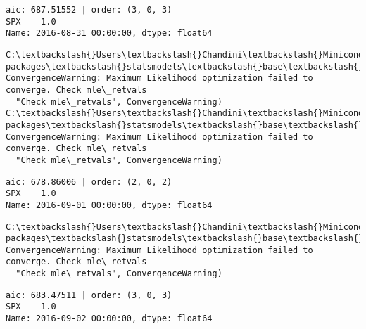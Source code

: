 \documentclass[11pt]{article}
\begin{document}
    \begin{Verbatim}[commandchars=\\\{\}]
aic: 687.51552 | order: (3, 0, 3)
SPX    1.0
Name: 2016-08-31 00:00:00, dtype: float64

    \end{Verbatim}

    \begin{Verbatim}[commandchars=\\\{\}]
C:\textbackslash{}Users\textbackslash{}Chandini\textbackslash{}Miniconda3\textbackslash{}envs\textbackslash{}auquan\textbackslash{}lib\textbackslash{}site-packages\textbackslash{}statsmodels\textbackslash{}base\textbackslash{}model.py:496: ConvergenceWarning: Maximum Likelihood optimization failed to converge. Check mle\_retvals
  "Check mle\_retvals", ConvergenceWarning)
C:\textbackslash{}Users\textbackslash{}Chandini\textbackslash{}Miniconda3\textbackslash{}envs\textbackslash{}auquan\textbackslash{}lib\textbackslash{}site-packages\textbackslash{}statsmodels\textbackslash{}base\textbackslash{}model.py:496: ConvergenceWarning: Maximum Likelihood optimization failed to converge. Check mle\_retvals
  "Check mle\_retvals", ConvergenceWarning)

    \end{Verbatim}

    \begin{Verbatim}[commandchars=\\\{\}]
aic: 678.86006 | order: (2, 0, 2)
SPX    1.0
Name: 2016-09-01 00:00:00, dtype: float64

    \end{Verbatim}

    \begin{Verbatim}[commandchars=\\\{\}]
C:\textbackslash{}Users\textbackslash{}Chandini\textbackslash{}Miniconda3\textbackslash{}envs\textbackslash{}auquan\textbackslash{}lib\textbackslash{}site-packages\textbackslash{}statsmodels\textbackslash{}base\textbackslash{}model.py:496: ConvergenceWarning: Maximum Likelihood optimization failed to converge. Check mle\_retvals
  "Check mle\_retvals", ConvergenceWarning)

    \end{Verbatim}

    \begin{Verbatim}[commandchars=\\\{\}]
aic: 683.47511 | order: (3, 0, 3)
SPX    1.0
Name: 2016-09-02 00:00:00, dtype: float64

    \end{Verbatim}
\end{document}

